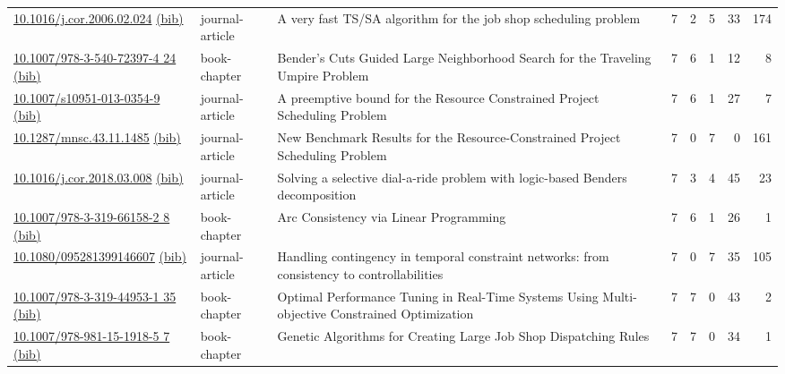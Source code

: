 {\begin{longtable}{p{5cm}lp{11cm}rrrrr}
\href{http://dx.doi.org/10.1016/j.cor.2006.02.024}{10.1016/j.cor.2006.02.024} \href{https://www.doi2bib.org/bib/10.1016/j.cor.2006.02.024}{(bib)} & journal-article & A very fast TS/SA algorithm for the job shop scheduling problem & 7 & 2 & 5 & 33 & 174 \\
\href{http://dx.doi.org/10.1007/978-3-540-72397-4_24}{10.1007/978-3-540-72397-4 24} \href{https://www.doi2bib.org/bib/10.1007/978-3-540-72397-4_24}{(bib)} & book-chapter & Bender's Cuts Guided Large Neighborhood Search for the Traveling Umpire Problem & 7 & 6 & 1 & 12 & 8 \\
\href{http://dx.doi.org/10.1007/s10951-013-0354-9}{10.1007/s10951-013-0354-9} \href{https://www.doi2bib.org/bib/10.1007/s10951-013-0354-9}{(bib)} & journal-article & A preemptive bound for the Resource Constrained Project Scheduling Problem & 7 & 6 & 1 & 27 & 7 \\
\href{http://dx.doi.org/10.1287/mnsc.43.11.1485}{10.1287/mnsc.43.11.1485} \href{https://www.doi2bib.org/bib/10.1287/mnsc.43.11.1485}{(bib)} & journal-article & New Benchmark Results for the Resource-Constrained Project Scheduling Problem & 7 & 0 & 7 & 0 & 161 \\
\href{http://dx.doi.org/10.1016/j.cor.2018.03.008}{10.1016/j.cor.2018.03.008} \href{https://www.doi2bib.org/bib/10.1016/j.cor.2018.03.008}{(bib)} & journal-article & Solving a selective dial-a-ride problem with logic-based Benders decomposition & 7 & 3 & 4 & 45 & 23 \\
\href{http://dx.doi.org/10.1007/978-3-319-66158-2_8}{10.1007/978-3-319-66158-2 8} \href{https://www.doi2bib.org/bib/10.1007/978-3-319-66158-2_8}{(bib)} & book-chapter & Arc Consistency via Linear Programming & 7 & 6 & 1 & 26 & 1 \\
\href{http://dx.doi.org/10.1080/095281399146607}{10.1080/095281399146607} \href{https://www.doi2bib.org/bib/10.1080/095281399146607}{(bib)} & journal-article & Handling contingency in temporal constraint networks: from consistency to controllabilities & 7 & 0 & 7 & 35 & 105 \\
\href{http://dx.doi.org/10.1007/978-3-319-44953-1_35}{10.1007/978-3-319-44953-1 35} \href{https://www.doi2bib.org/bib/10.1007/978-3-319-44953-1_35}{(bib)} & book-chapter & Optimal Performance Tuning in Real-Time Systems Using Multi-objective Constrained Optimization & 7 & 7 & 0 & 43 & 2 \\
\href{http://dx.doi.org/10.1007/978-981-15-1918-5_7}{10.1007/978-981-15-1918-5 7} \href{https://www.doi2bib.org/bib/10.1007/978-981-15-1918-5_7}{(bib)} & book-chapter & Genetic Algorithms for Creating Large Job Shop Dispatching Rules & 7 & 7 & 0 & 34 & 1 \\

\end{longtable}}
